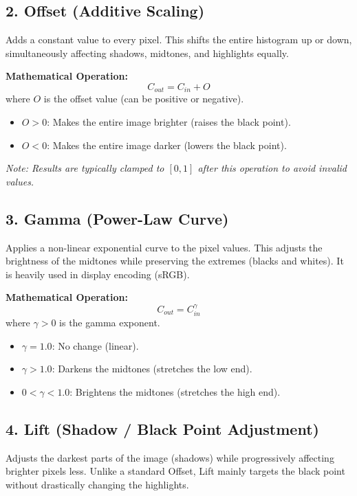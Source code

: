 \documentclass[UTF8]{ctexart}
\begin{document}
\subsection*{2. Offset (Additive Scaling)}
Adds a constant value to every pixel. This shifts the entire histogram up or down, simultaneously affecting shadows, midtones, and highlights equally.

\textbf{Mathematical Operation:}
\begin{equation}
	C_{out} = C_{in} + O
\end{equation}
where \( O \) is the offset value (can be positive or negative).
\begin{itemize}
	\item \( O > 0 \): Makes the entire image brighter (raises the black point).
	\item \( O < 0 \): Makes the entire image darker (lowers the black point).
\end{itemize}
\textit{Note: Results are typically clamped to \([0, 1]\) after this operation to avoid invalid values.}

\subsection*{3. Gamma (Power-Law Curve)}
Applies a non-linear exponential curve to the pixel values. This adjusts the brightness of the midtones while preserving the extremes (blacks and whites). It is heavily used in display encoding (sRGB).

\textbf{Mathematical Operation:}
\begin{equation}
	C_{out} = C_{in}^{\gamma}
\end{equation}
where \( \gamma > 0 \) is the gamma exponent.
\begin{itemize}
	\item \( \gamma = 1.0 \): No change (linear).
	\item \( \gamma > 1.0 \): Darkens the midtones (stretches the low end).
	\item \( 0 < \gamma < 1.0 \): Brightens the midtones (stretches the high end).
\end{itemize}

\subsection*{4. Lift (Shadow / Black Point Adjustment)}
Adjusts the darkest parts of the image (shadows) while progressively affecting brighter pixels less. Unlike a standard Offset, Lift mainly targets the black point without drastically changing the highlights.
\end{document}
